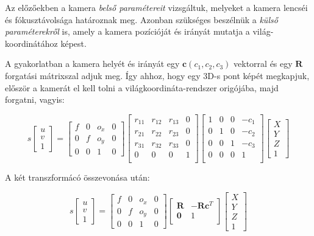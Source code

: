 Az előzőekben a kamera \textit{belső paramétereit} vizsgáltuk, melyeket a kamera lencséi és fókusztávolsága határoznak meg. Azonban szükséges beszélnük a \textit{külső paraméterekről} is, amely a kamera pozícióját és irányát mutatja a világ-koordinátához képest.

A gyakorlatban a kamera helyét és irányát egy $\mathbf{c}(c_1, c_2, c_3)$ vektorral és egy $\mathbf{R}$ forgatási mátrixszal adjuk meg. Így ahhoz, hogy egy 3D-s pont képét megkapjuk, először a kamerát el kell tolni a világkoordináta-rendszer origójába, majd forgatni, vagyis:

\[s \left[\begin{array}{c}
u \\ 
v \\
1
\end{array}\right] = \left[\begin{array}{cccc}
f & 0 & o_x & 0 \\ 
0 & f & o_y & 0 \\
0 & 0 & 1 & 0
\end{array}\right] \left[\begin{array}{cccc}
r_{11} & r_{12} & r_{13} & 0 \\ 
r_{21} & r_{22} & r_{23} & 0 \\ 
r_{31} & r_{32} & r_{33} & 0 \\ 
0 & 0 & 0 & 1 \\ 
\end{array}\right] \left[\begin{array}{cccc}
1 & 0 & 0 & -c_1 \\ 
0 & 1 & 0 & -c_2 \\ 
0 & 0 & 1 & -c_3 \\ 
0 & 0 & 0 & 1 \\ 
\end{array}\right] \left[\begin{array}{c}
X \\ 
Y \\
Z \\
1
\end{array}\right]\]

A két transzformácó összevonása után:

\[s \left[\begin{array}{c}
u \\ 
v \\
1
\end{array}\right] = \left[\begin{array}{cccc}
f & 0 & o_x & 0 \\ 
0 & f & o_y & 0 \\
0 & 0 & 1 & 0
\end{array}\right] \left[\begin{array}{cc}
\mathbf{R} & -\mathbf{R} \mathbf{c}^T \\ 
\mathbf{0} & 1 \\ 
\end{array}\right] \left[\begin{array}{c}
X \\ 
Y \\
Z \\
1
\end{array}\right]\]

